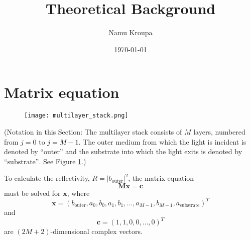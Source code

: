 \documentclass[]{article}
\title{Theoretical Background}
\author{Namu Kroupa}
\date{\today}
\begin{document}
	\maketitle
	
	\section{Matrix equation}
	\begin{figure}[H]
		\centering
		\texttt{[image: multilayer\_stack.png]}
		\caption{}
		\label{fig:multilayer-stack}
	\end{figure}
	
	{\small
	(Notation in this Section: The multilayer stack consists of $M$ layers, numbered from $j=0$ to $j=M-1$. The outer medium from which the light is incident is denoted by $\text{``outer''}$ and the substrate into which the light exits is denoted by $\text{``substrate''}$. See Figure \ref{fig:multilayer-stack}.)}
	
	To calculate the reflectivity, $R=|b_\text{outer}|^2$, the matrix equation 
	\begin{equation}\label{eqn:matrix-equation}
		\mathbf{M}\mathbf{x}=\mathbf{c}
	\end{equation}
	must be solved for $\mathbf{x}$, where
	\begin{equation}
		\mathbf{x}=(b_\text{outer},a_0,b_0,a_1,b_1,\dots,a_{M-1},b_{M-1},a_\text{substrate})^T
	\end{equation}
	and
	\begin{equation}
		\mathbf{c}=(1,1,0,0,\dots,0)^T
	\end{equation}
	are $(2M+2)$-dimensional complex vectors.
	
\end{document}

